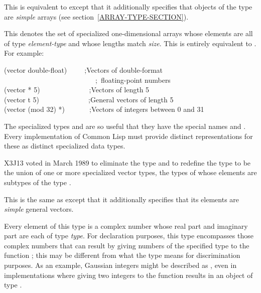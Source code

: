 \begin{flushdesc}
\item[\cd{(simple-array {\it element-type} {\it dimensions})}]
This is equivalent
to  except that it additionally
specifies that objects of the type are {\it simple} arrays
(see section~\ref{ARRAY-TYPE-SECTION}).

\item[\cd{(vector {\it element-type} {\it size})}]
This denotes the set of
specialized one-dimensional arrays whose elements are all of type {\it
element-type} and whose lengths match {\it size}.  This is entirely equivalent to
.
For example:
\begin{lisp}
(vector double-float)~~~~~;{\rm Vectors of double-format} \\
~~~~~~~~~~~~~~~~~~~~~~~~~~;~{\rm floating-point numbers} \\
(vector * 5)~~~~~~~~~~~~~~;{\rm Vectors of length 5} \\
(vector t 5)~~~~~~~~~~~~~~;{\rm General vectors of length 5} \\
(vector (mod 32) *)~~~~~~~;{\rm Vectors of integers between 0 and 31}
\end{lisp}
\begin{obsolete}
The specialized types  and  are so
useful that they have the special names  and .
Every implementation of Common Lisp must provide distinct representations for
these as distinct specialized data types.
\end{obsolete}

\begin{newer}
X3J13 voted in March 1989 
to eliminate the type  and to redefine the type
 to be the union of one or more specialized vector
types, the types of whose elements are subtypes of the type .
\end{newer}

\item[\cd{(simple-vector {\it size})}]
This is the same
as  except that it additionally specifies
that its elements are {\it simple} general vectors.

\item[\cd{(complex {\it type})}]
Every element of this type is a
complex number whose real part
and imaginary part are each of type {\it type}.
For declaration purposes, this type encompasses those complex numbers
that can result by giving numbers of the specified type
to the function ; this may be different
from what the type means for discrimination purposes.
As an example, Gaussian integers might be
described as , even in implementations
where giving two integers to the function  results
in an object of type .


\end{flushdesc}
